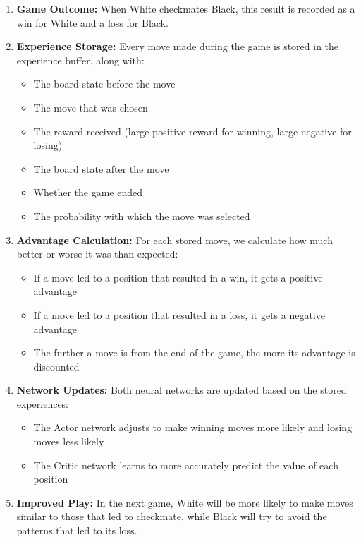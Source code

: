 \documentclass[11pt]{article}
\begin{document}
\begin{enumerate}
    \item \textbf{Game Outcome:} When White checkmates Black, this result is recorded as a win for White and a loss for Black.
    
    \item \textbf{Experience Storage:} Every move made during the game is stored in the experience buffer, along with:
    \begin{itemize}
        \item The board state before the move
        \item The move that was chosen
        \item The reward received (large positive reward for winning, large negative for losing)
        \item The board state after the move
        \item Whether the game ended
        \item The probability with which the move was selected
    \end{itemize}
    
    \item \textbf{Advantage Calculation:} For each stored move, we calculate how much better or worse it was than expected:
    \begin{itemize}
        \item If a move led to a position that resulted in a win, it gets a positive advantage
        \item If a move led to a position that resulted in a loss, it gets a negative advantage
        \item The further a move is from the end of the game, the more its advantage is discounted
    \end{itemize}
    
    \item \textbf{Network Updates:} Both neural networks are updated based on the stored experiences:
    \begin{itemize}
        \item The Actor network adjusts to make winning moves more likely and losing moves less likely
        \item The Critic network learns to more accurately predict the value of each position
    \end{itemize}
    
    \item \textbf{Improved Play:} In the next game, White will be more likely to make moves similar to those that led to checkmate, while Black will try to avoid the patterns that led to its loss.
\end{enumerate}
\end{document}
